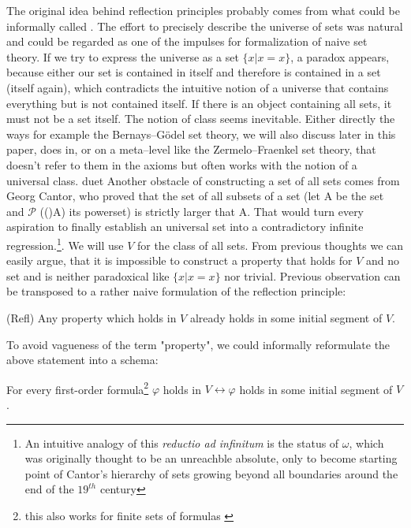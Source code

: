 \documentclass[12pt,a4paper]{article}
\newcommand{\power}[1]{\ensuremath{\mathscr{P}} (#1)}
\renewcommand{\iff}{\leftrightarrow}
\begin{document}
The original idea behind reflection principles probably comes from what could be informally called .
The effort to precisely describe the universe of sets was natural and could be regarded as one of the impulses for formalization of naive set theory.
If we try to express the universe as a set $\{x  |  x = x\}$, a paradox appears, because either our set is contained in itself and therefore is contained in a set (itself again), which contradicts the intuitive notion of a universe that contains everything but is not contained itself.
If there is an object containing all sets, it must not be a set itself. The notion of class seems inevitable. Either directly the ways for example the Bernays–Gödel set theory, we will also discuss later in this paper, does in, or on a meta–level like the Zermelo–Fraenkel set theory, that doesn't refer to them in the axioms but often works with the notion of a universal class.
duet
Another obstacle of constructing a set of all sets comes from Georg Cantor, who proved that the set of all subsets of a set (let A be the set and \power(A) its powerset) is strictly larger that A. That would turn every aspiration to finally establish an universal set into a contradictory infinite regression.\footnote{An intuitive analogy of this \emph{reductio ad infinitum} is the status of $\omega$, which was originally thought to be an unreachble absolute, only to become starting point of Cantor's hierarchy of sets growing beyond all boundaries around the end of the $19^{th}$ century}. We will use $V$ for the class of all sets. %
\newpage
From previous thoughts we can easily argue, that it is impossible to construct a property that holds for $V$ and no set and is neither paradoxical like $\{x  |  x = x\}$ nor trivial. Previous observation can be transposed to a rather naive formulation of the reflection principle:


\medskip

(Refl) Any property which holds in $V$ already holds in some initial segment of $V$. 

\medskip

To avoid vagueness of the term "property", we could informally reformulate the above statement into a schema: 

\medskip

For every first-order formula\footnote{this also works for finite sets of formulas \cite[p.~168]{JechBook}} $\varphi$ holds in $V \iff \varphi$ holds in some initial segment of $V$.
\end{document}
